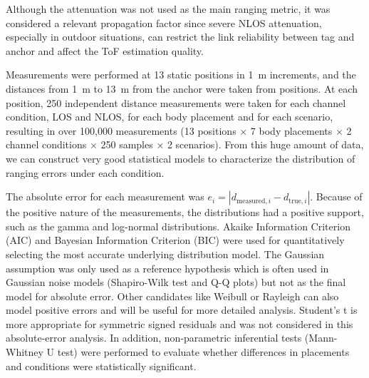 Although the attenuation was not used as the main ranging metric, it was considered a relevant propagation factor since severe NLOS attenuation, especially in outdoor situations, can restrict the link reliability between tag and anchor and affect the ToF estimation quality.

Measurements were performed at 13 static positions in 1~m increments, and the distances from 1~m to 13~m from the anchor were taken from positions. At each position, 250 independent distance measurements were taken for each channel condition, LOS and NLOS, for each body placement and for each scenario, resulting in over 100,000 measurements (13 positions × 7 body placements × 2 channel conditions × 250 samples × 2 scenarios). From this huge amount of data, we can construct very good statistical models to characterize the distribution of ranging errors under each condition.

The absolute error for each measurement was ${e_i = |d_{\text{measured},i} - d_{\text{true},i}|}$. Because of the positive nature of the measurements, the distributions had a positive support, such as the gamma and log-normal distributions. Akaike Information Criterion (AIC) and Bayesian Information Criterion (BIC) were used for quantitatively selecting the most accurate underlying distribution model. The Gaussian assumption was only used as a reference hypothesis which is often used in Gaussian noise models (Shapiro-Wilk test and Q-Q plots) but not as the final model for absolute error. Other candidates like Weibull or Rayleigh can also model positive errors and will be useful for more detailed analysis. Student's t is more appropriate for symmetric signed residuals and was not considered in this absolute-error analysis. In addition, non-parametric inferential tests (Mann-Whitney U test) were performed to evaluate whether differences in placements and conditions were statistically significant.
